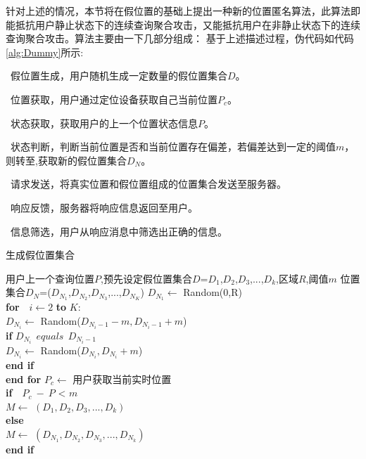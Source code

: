 针对上述的情况，本节将在假位置的基础上提出一种新的位置匿名算法，此算法即能抵抗用户静止状态下的连续查询聚合攻击，又能抵抗用户在非静止状态下的连续查询聚合攻击。算法主要由一下几部分组成：
基于上述描述过程，伪代码如代码\ref{alg:Dummy}所示:

~假位置生成，用户随机生成一定数量的假位置集合$D$。

~位置获取，用户通过定位设备获取自己当前位置$P_c$。

~状态获取，获取用户的上一个位置状态信息$P$。

~状态判断，判断当前位置是否和当前位置存在偏差，若偏差达到一定的阈值$m$，则转至,获取新的假位置集合$D_N$。

~请求发送，将真实位置和假位置组成的位置集合发送至服务器。

~响应反馈，服务器将响应信息返回至用户。

~信息筛选，用户从响应消息中筛选出正确的信息。
\begin{algorithm}[!htb]
\small
\renewcommand{\algorithmicrequire}{\textbf{Input:}}
\renewcommand{\algorithmicensure}{\textbf{Output:}}
\caption{生成假位置集合}
\label{alg:Dummy}
\begin{algorithmic}[1]
    \Require 用户上一个查询位置$P$,预先设定假位置集合$D$={$D_1$,$D_2$,$D_3$,...,$D_k$},区域$R$,阈值$m$
    \Ensure 位置集合$D_N$=($D_{N_1}$,$D_{N_2}$,$D_{N_3}$,...,$D_{N_K}$)
    \State $D_{N_1} \leftarrow $ Random(0,R)\\
    \textbf{for}~~$i \gets 2 $ \textbf{to} $K:$\\
        \hspace{0.5cm} $D_{N_i} \gets $ Random($D_{N_i-1}-m,D_{N_i-1}+m$)\\
        \hspace{0.5cm} \textbf{if} $D_{N_i}~~equals~~D_{N_i-1}$\\
        \hspace{1cm} $D_{N_i} \gets $ Random($D_{N_i},D_{N_i}+m$)\\
        \hspace{0.5cm} \textbf{end if}\\
    \textbf{end for}
    \State $P_c \gets$ 用户获取当前实时位置\\
    \textbf{if}~~$P_c~-~P$ < $m$\\
        \hspace{0.5cm} $M \gets$ $(D_1,D_2,D_3,...,D_k)$\\
    \textbf{else}\\
        \hspace{0.5cm} $M \gets $ $(D_{N_1},D_{N_2},D_{N_3},...,D_{N_k})$\\
    \textbf{end if}
\end{algorithmic}
\end{algorithm}

